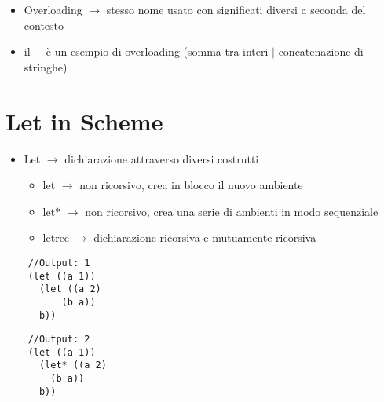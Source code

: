 \documentclass[12pt]{extarticle}
\begin{document}
\smallskip

\begin{itemize}
  \item Overloading $\rightarrow$ stesso nome usato con significati diversi a seconda del contesto
  \item il $+$ è un esempio di overloading (somma tra interi $\mid$ concatenazione di stringhe)
\end{itemize}

\section*{Let in Scheme}
\begin{itemize}
  \item Let $\rightarrow$ dichiarazione attraverso diversi costrutti
  \begin{itemize}
    \item let $\rightarrow$  non ricorsivo, crea in blocco il nuovo ambiente
    \item let$*$ $\rightarrow$  non ricorsivo, crea una serie di ambienti in modo sequenziale
    \item letrec $\rightarrow$ dichiarazione ricorsiva e mutuamente ricorsiva
  \end{itemize}
\end{itemize}

\begin{multicols}{2}
  \begin{lstlisting}
    //Output: 1
    (let ((a 1))
      (let ((a 2)
          (b a))
      b))
  \end{lstlisting}
  \columnbreak 
  \begin{lstlisting}
    //Output: 2
    (let ((a 1))
      (let* ((a 2)
        (b a))
      b))
  \end{lstlisting}
\end{multicols}

\newpage
\end{document}
